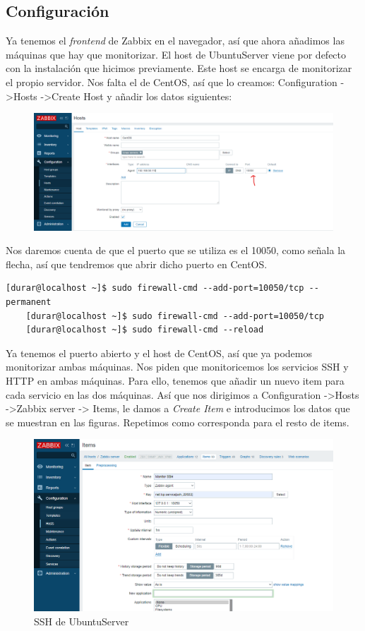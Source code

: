 \documentclass[a4paper]{article}
\begin{document}
\subsection{Configuración}
Ya tenemos el \textsl{frontend} de Zabbix en el navegador, así que ahora añadimos las máquinas que hay que monitorizar.
El host de UbuntuServer viene por defecto con la instalación que hicimos previamente. Este host se encarga 
de monitorizar el propio servidor. Nos falta el de CentOS, así que lo creamos:
Configuration -\textgreater Hosts -\textgreater Create Host y añadir los datos siguientes:
\newpage
\begin{figure}
    \centering
    \includegraphics[width=\textwidth]{creando host centos.png}
\end{figure}
Nos daremos cuenta de que el puerto que se utiliza es el 10050, como señala la flecha, así que tendremos 
que abrir dicho puerto en CentOS.
\begin{lstlisting}[style=bashCentOS]
    [durar@localhost ~]$ sudo firewall-cmd --add-port=10050/tcp --permanent
    [durar@localhost ~]$ sudo firewall-cmd --add-port=10050/tcp
    [durar@localhost ~]$ sudo firewall-cmd --reload
\end{lstlisting}
Ya tenemos el puerto abierto y el host de CentOS, así que ya podemos monitorizar ambas máquinas.
Nos piden que monitoricemos los servicios SSH y HTTP en ambas máquinas. Para ello, tenemos que añadir
un nuevo item para cada servicio en las dos máquinas. 
Así que nos dirigimos a Configuration -\textgreater Hosts -\textgreater Zabbix server -\textgreater
Items, le damos a \textsl{Create Item} e introducimos los datos que se muestran en las figuras. Repetimos como 
corresponda para el resto de items.
\newline
\begin{figure}[hbt!]
    \caption{SSH de UbuntuServer}
    \includegraphics[width=\textwidth]{creando item ssh.png}
\end{figure} 
\end{document}
